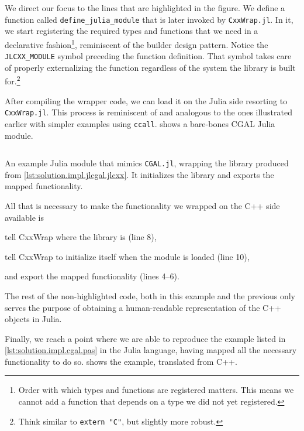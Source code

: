 We direct our focus to the lines that are highlighted in the figure.  We define
a function called \texttt{define\_julia\_module} that is later invoked by
\texttt{CxxWrap.jl}.  In it, we start registering the required types and
functions that we need in a declarative fashion\footnote{Order with which types
and functions are registered matters.  This means we cannot add a function that
depends on a type we did not yet registered.}, reminiscent of the builder design
pattern.  Notice the \texttt{JLCXX\_MODULE} symbol preceding the function
definition.  That symbol takes care of properly externalizing the function
regardless of the system the library is built for.\footnote{Think similar to
\texttt{extern "C"}, but slightly more robust.}

After compiling the wrapper code, we can load it on the Julia side resorting to
\texttt{CxxWrap.jl}.  This process is reminiscent of and analogous to the ones
illustrated earlier with simpler examples using \texttt{ccall}.
 shows a bare-bones CGAL Julia module.

\begin{listing}[htb]
  \inputminted[highlightlines={4-6,8,10}]{julia}{jl/CGAL.jl} 
  \caption[Bare-bones Julia module wrapping some of CGAL]{
    An example Julia module that mimics \texttt{CGAL.jl}, wrapping the library
    produced from \cref{lst:solution.impl.jlcgal.jlcxx}.  It initializes the
    library and exports the mapped functionality.}%
  \label{lst:solution.impl.jlcgal.cgal}
\end{listing}

All that is necessary to make the functionality we wrapped on the C++ side
available is
\begin{enumerate*}[label= (\arabic*)]
  \item tell CxxWrap where the library is (line 8),
  \item tell CxxWrap to initialize itself when the module is loaded (line 10),
  \item and export the mapped functionality (lines 4--6).
\end{enumerate*}
The rest of the non-highlighted code, both in this example and the previous
only serves the purpose of obtaining a human-readable representation of the C++
objects in Julia.

Finally, we reach a point where we are able to reproduce the example listed in
\cref{lst:solution.impl.cgal.pas} in the Julia language, having mapped all the
necessary functionality to do so.   shows the
example, translated from C++.

